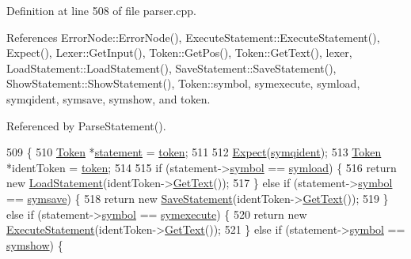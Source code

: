Definition at line 508 of file parser.\+cpp.



References Error\+Node\+::\+Error\+Node(), Execute\+Statement\+::\+Execute\+Statement(), Expect(), Lexer\+::\+Get\+Input(), Token\+::\+Get\+Pos(), Token\+::\+Get\+Text(), lexer, Load\+Statement\+::\+Load\+Statement(), Save\+Statement\+::\+Save\+Statement(), Show\+Statement\+::\+Show\+Statement(), Token\+::symbol, symexecute, symload, symqident, symsave, symshow, and token.



Referenced by Parse\+Statement().


\begin{DoxyCode}
509 \{
510     \hyperlink{structToken}{Token} *\hyperlink{nodes_8h_acac9cbaeea226ed297804c012dc12b16a338f0b1773c656a2647feb9e2bf6be09}{statement} = \hyperlink{classParser_a467028559d31c5b33f16ca8be56715cc}{token};
511 
512     \hyperlink{classParser_a811765334b0cd3f01152c35c9f5bcaec}{Expect}(\hyperlink{lex_8h_a7feef761cd73fac6e25b8bb80d2c4e54a9a4f2a8a367485e87d9faf675bec17af}{symqident});
513     \hyperlink{structToken}{Token} *identToken = \hyperlink{classParser_a467028559d31c5b33f16ca8be56715cc}{token};
514 
515     \textcolor{keywordflow}{if} (statement->\hyperlink{structToken_aa671eaaae5632c5277e89a090d864820}{symbol} == \hyperlink{lex_8h_a7feef761cd73fac6e25b8bb80d2c4e54a9d1e9fc653c6385101e095e83f2715a5}{symload}) \{
516         \textcolor{keywordflow}{return} \textcolor{keyword}{new} \hyperlink{classLoadStatement}{LoadStatement}(identToken->\hyperlink{structToken_a15f1043de07ce8e452fbf115b85def71}{GetText}());
517     \} \textcolor{keywordflow}{else} \textcolor{keywordflow}{if} (statement->\hyperlink{structToken_aa671eaaae5632c5277e89a090d864820}{symbol} == \hyperlink{lex_8h_a7feef761cd73fac6e25b8bb80d2c4e54a46b88bb5b84403708ad27da26b2177f6}{symsave}) \{
518         \textcolor{keywordflow}{return} \textcolor{keyword}{new} \hyperlink{classSaveStatement}{SaveStatement}(identToken->\hyperlink{structToken_a15f1043de07ce8e452fbf115b85def71}{GetText}());
519     \} \textcolor{keywordflow}{else} \textcolor{keywordflow}{if} (statement->\hyperlink{structToken_aa671eaaae5632c5277e89a090d864820}{symbol} == \hyperlink{lex_8h_a7feef761cd73fac6e25b8bb80d2c4e54a309719a3cb6c488d29f9e1050dfc7fb1}{symexecute}) \{
520         \textcolor{keywordflow}{return} \textcolor{keyword}{new} \hyperlink{classExecuteStatement}{ExecuteStatement}(identToken->\hyperlink{structToken_a15f1043de07ce8e452fbf115b85def71}{GetText}());
521     \} \textcolor{keywordflow}{else} \textcolor{keywordflow}{if} (statement->\hyperlink{structToken_aa671eaaae5632c5277e89a090d864820}{symbol} == \hyperlink{lex_8h_a7feef761cd73fac6e25b8bb80d2c4e54a880d37d6af9654b8295fd1c09794c84a}{symshow}) \{

\end{DoxyCode}
